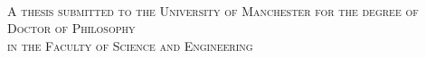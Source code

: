 \begin{titlepage}
    \begin{addmargin}[-1cm]{-1cm}
    \begin{center}
        \large

        \hfill

        \vfill

        \vspace{2cm}

        \begingroup
            \color{CTtitle}\spacedallcaps{\myTitle} \\ \bigskip
        \endgroup

        \vspace{3cm}

        \begingroup
        \textsc{A thesis submitted to the University of Manchester for the degree of \\ Doctor of Philosophy \\ in the Faculty of Science and Engineering}
        \endgroup

        \vspace{4cm}
        \vspace{4cm}

        \spacedallcaps{\myName}

        \begingroup
        \vspace{0.5cm}
        \small
        \endgroup

        \vfill

    \end{center}
  \end{addmargin}
\end{titlepage}
